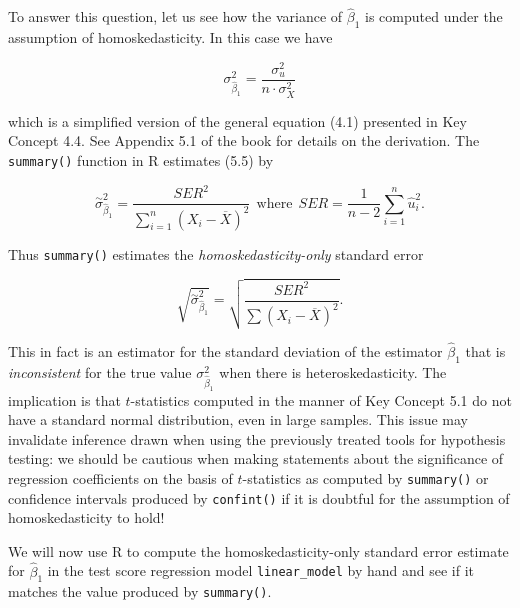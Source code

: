 \documentclass[]{book}
\newenvironment{Shaded}{\begin{snugshade}}{\end{snugshade}}
\newcommand{\KeywordTok}[1]{\textcolor[rgb]{0.13,0.29,0.53}{\textbf{#1}}}
\newcommand{\DecValTok}[1]{\textcolor[rgb]{0.00,0.00,0.81}{#1}}
\newcommand{\FloatTok}[1]{\textcolor[rgb]{0.00,0.00,0.81}{#1}}
\newcommand{\StringTok}[1]{\textcolor[rgb]{0.31,0.60,0.02}{#1}}
\newcommand{\CommentTok}[1]{\textcolor[rgb]{0.56,0.35,0.01}{\textit{#1}}}
\newcommand{\OperatorTok}[1]{\textcolor[rgb]{0.81,0.36,0.00}{\textbf{#1}}}
\newcommand{\NormalTok}[1]{#1}
\theoremstyle{definition}
\theoremstyle{definition}
\theoremstyle{definition}
\theoremstyle{remark}
\begin{document}
To answer this question, let us see how the variance of \(\hat\beta_1\)
is computed under the assumption of homoskedasticity. In this case we
have

\[ \sigma^2_{\hat\beta_1} = \frac{\sigma^2_u}{n \cdot \sigma^2_X} \tag{5.5} \]

which is a simplified version of the general equation (4.1) presented in
Key Concept 4.4. See Appendix 5.1 of the book for details on the
derivation. The \texttt{summary()} function in R estimates (5.5) by

\[ \overset{\sim}{\sigma}^2_{\hat\beta_1} = \frac{SER^2}{\sum_{i=1}^n (X_i - \overline{X})^2} \ \ \text{where} \ \ SER=\frac{1}{n-2} \sum_{i=1}^n \hat u_i^2. \]

Thus \texttt{summary()} estimates the \emph{homoskedasticity-only}
standard error

\[ \sqrt{ \overset{\sim}{\sigma}^2_{\hat\beta_1} } = \sqrt{ \frac{SER^2}{\sum(X_i - \overline{X})^2} }. \]

This in fact is an estimator for the standard deviation of the estimator
\(\hat{\beta}_1\) that is \emph{inconsistent} for the true value
\(\sigma^2_{\hat\beta_1}\) when there is heteroskedasticity. The
implication is that \(t\)-statistics computed in the manner of Key
Concept 5.1 do not have a standard normal distribution, even in large
samples. This issue may invalidate inference drawn when using the
previously treated tools for hypothesis testing: we should be cautious
when making statements about the significance of regression coefficients
on the basis of \(t\)-statistics as computed by \texttt{summary()} or
confidence intervals produced by \texttt{confint()} if it is doubtful
for the assumption of homoskedasticity to hold!

We will now use R to compute the homoskedasticity-only standard error
estimate for \(\hat{\beta}_1\) in the test score regression model
\texttt{linear\_model} by hand and see if it matches the value produced
by \texttt{summary()}.

\begin{Shaded}
\end{Shaded}
\end{document}

